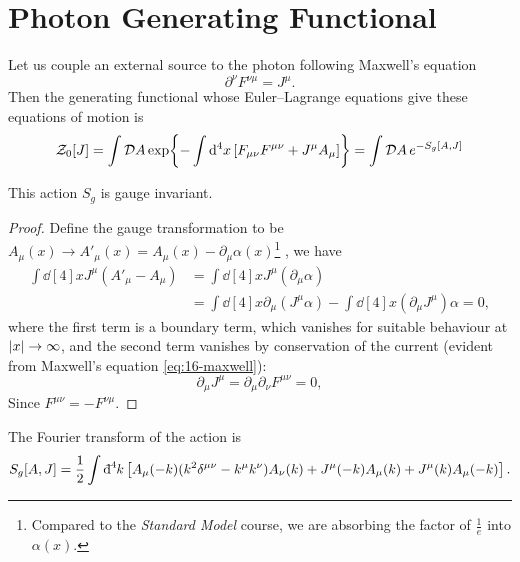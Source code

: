 
\section{Photon Generating Functional}%
\label{sec:photon_generating_functional}

Let us couple an external source to the photon following Maxwell's equation
\begin{equation}
  \label{eq:16-maxwell}
  \partial^{\nu} F^{\nu\mu} = J^{\mu}.
\end{equation}
Then the generating functional whose Euler--Lagrange equations give these equations of motion is
\begin{equation}
  \mathcal{Z}_0[J] = \int \pdd{A} \exp{- \int \dd[4]{x} [F_{\mu\nu} F^{\mu\nu} + J^{\mu} A_{\mu}]} = \int \pdd{A} e^{-S_g[A, J]}
\end{equation}
\begin{claim}
  This action $S_g$ is gauge invariant.
\end{claim}
\begin{proof}
  Define the gauge transformation to be $A_{\mu}(x) \to A'_{\mu}(x) = A_{\mu}(x) - \partial_{\mu} \alpha(x)$\footnote{Compared to the \emph{Standard Model} course, we are absorbing the factor of $\frac{1}{e}$ into $\alpha(x)$.}
  , we have
  \begin{align}
    \int \dd[4]{x} J^{\mu} (A'_{\mu} - A_{\mu}) &= \int \dd[4]{x} J^{\mu}(\partial_{\mu} \alpha) \\
						&= \int \dd[4]{x} \partial_{\mu} (J^{\mu} \alpha ) - \int \dd[4]{x} (\partial_{\mu} J^{\mu})\alpha = 0,
  \end{align}
  where the first term is a boundary term, which vanishes for suitable behaviour at $\abs{x} \to \infty$, and the second term vanishes by conservation of the current (evident from Maxwell's equation \eqref{eq:16-maxwell}):
  \begin{equation}
    \partial_{\mu} J^{\mu} = \partial_{\mu} \partial_{\nu} F^{\mu\nu} = 0,
  \end{equation}
  Since $F^{\mu\nu} = - F^{\nu\mu}$.
\end{proof}

The Fourier transform of the action is
\begin{equation}
  S_g[A, J] = \frac{1}{2} \int \bdd[4]{k} \left[ A_{\mu}(-k) (k^2 \delta^{\mu\nu} - k^{\mu} k^{\nu}) A_{\nu}(k) + J^{\mu}(-k) A_{\mu}(k) + J^{\mu}(k) A_{\mu}(-k) \right].
\end{equation}

